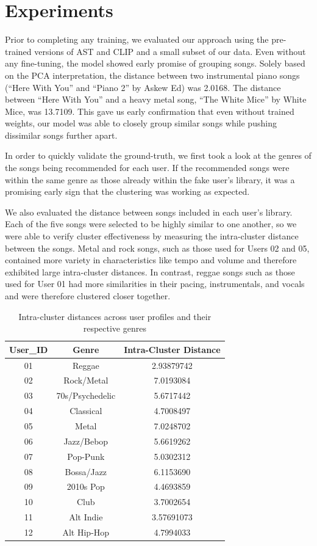 \section{Experiments}

Prior to completing any training, we evaluated our approach using the pre-trained versions of AST and CLIP and a small subset of our data. Even without any fine-tuning, the model showed early promise of grouping songs. Solely based on the PCA interpretation, the distance between two instrumental piano songs (“Here With You” and “Piano 2” by Askew Ed) was 2.0168. The distance between “Here With You” and a heavy metal song, “The White Mice” by White Mice, was 13.7109. This gave us early confirmation that even without trained weights, our model was able to closely group similar songs while pushing dissimilar songs further apart.

In order to quickly validate the ground-truth, we first took a look at the genres of the songs being recommended for each user. If the recommended songs were within the same genre as those already within the fake user’s library, it was a promising early sign that the clustering was working as expected.

We also evaluated the distance between songs included in each user’s library. Each of the five songs were selected to be highly similar to one another, so we were able to verify cluster effectiveness by measuring the intra-cluster distance between the songs. Metal and rock songs, such as those used for Users 02 and 05, contained more variety in characteristics like tempo and volume and therefore exhibited large intra-cluster distances. In contrast, reggae songs such as those used for User 01 had more similarities in their pacing, instrumentals, and vocals and were therefore clustered closer together.

\begin{table}[ht]
    \centering
    \begin{tabular}{ccc}\toprule
 User\_ID& Genre&Intra-Cluster Distance\\\midrule
         01&  Reggae& 2.93879742\\
         02&  Rock/Metal& 7.0193084\\
         03&  70s/Psychedelic& 5.6717442\\
         04&  Classical& 4.7008497\\
         05&  Metal& 7.0248702\\
         06&  Jazz/Bebop& 5.6619262\\
         07&  Pop-Punk& 5.0302312\\
         08&  Bossa/Jazz& 6.1153690\\
         09&  2010s Pop& 4.4693859\\
         10&  Club& 3.7002654\\ 
 11& Alt Indie&3.57691073\\
 12& Alt Hip-Hop&4.7994033\\ \bottomrule
    \end{tabular}
    \caption{Intra-cluster distances across user profiles and their respective genres}
    \label{tab:placeholder}
\end{table}

